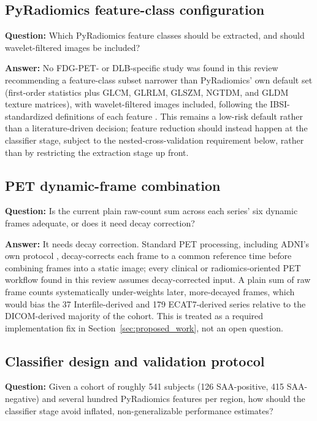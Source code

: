 \subsection{PyRadiomics feature-class configuration}
\textbf{Question:} Which PyRadiomics feature classes should be extracted, and should wavelet-filtered images be included?

\textbf{Answer:} No FDG-PET- or DLB-specific study was found in this review recommending a feature-class subset narrower than PyRadiomics' own default set (first-order statistics plus GLCM, GLRLM, GLSZM, NGTDM, and GLDM texture matrices), with wavelet-filtered images included, following the IBSI-standardized definitions of each feature \cite{vangriethuysen2017pyradiomics,zwanenburg2020ibsi}. This remains a low-risk default rather than a literature-driven decision; feature reduction should instead happen at the classifier stage, subject to the nested-cross-validation requirement below, rather than by restricting the extraction stage up front.

\subsection{PET dynamic-frame combination}
\textbf{Question:} Is the current plain raw-count sum across each series' six dynamic frames adequate, or does it need decay correction?

\textbf{Answer:} It needs decay correction. Standard PET processing, including ADNI's own protocol \cite{jagust2010petcore}, decay-corrects each frame to a common reference time before combining frames into a static image; every clinical or radiomics-oriented PET workflow found in this review assumes decay-corrected input. A plain sum of raw frame counts systematically under-weights later, more-decayed frames, which would bias the 37 Interfile-derived and 179 ECAT7-derived series relative to the DICOM-derived majority of the cohort. This is treated as a required implementation fix in Section~\ref{sec:proposed_work}, not an open question.

\subsection{Classifier design and validation protocol}
\textbf{Question:} Given a cohort of roughly 541 subjects (126 SAA-positive, 415 SAA-negative) and several hundred PyRadiomics features per region, how should the classifier stage avoid inflated, non-generalizable performance estimates?

